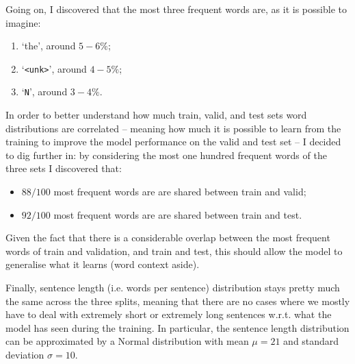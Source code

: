 Going on, I discovered that the most three frequent words are, as it is possible to imagine:
\begin{enumerate}
    \item `the', around $5-6\%$;
    \item `\texttt{<unk>}', around $4-5\%$;
    \item `\texttt{N}', around $3-4\%$.
\end{enumerate}

In order to better understand how much train, valid, and test sets word distributions are correlated -- meaning how much it is possible to learn from the training to improve the model performance on the valid and test set -- I decided to dig further in: by considering the most one hundred frequent words of the three sets I discovered that:
\begin{itemize}
    \item $88/100$ most frequent words are are shared between train and valid;
    \item $92/100$ most frequent words are are shared between train and test.
\end{itemize}
Given the fact that there is a considerable overlap between the most frequent words of train and validation, and train and test, this should allow the model to generalise what it learns (word context aside).


Finally, sentence length (i.e. words per sentence) distribution stays pretty much the same across the three splits, meaning that there are no cases where we mostly have to deal with extremely short or extremely long sentences w.r.t. what the model has seen during the training. In particular, the sentence length distribution can be approximated by a Normal distribution with mean $\mu = 21$ and standard deviation $\sigma = 10$.